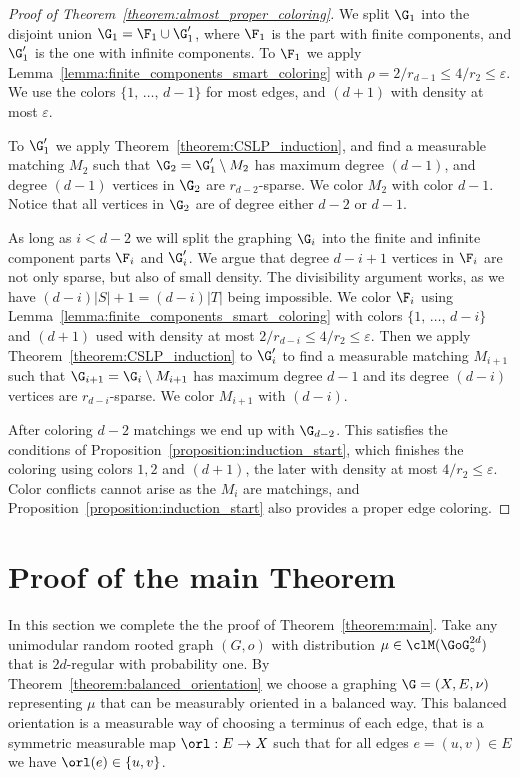 \begin{proof}[Proof of Theorem~\ref{theorem:almost_proper_coloring}]
We split $\G_1$ into the disjoint union $\G_1 = \F_1 \cup \G'_1$, where $\F_1$ is the part with finite components, and $\G'_1$ is the one with infinite components. To $\F_1$ we apply Lemma~\ref{lemma:finite_components_smart_coloring} with $\rho = 2 / r_{d-1} \leq 4 / r_2 \leq \varepsilon$. We use the colors $\{1,\,\ldots,\,d-1\}$ for most edges, and $(d+1)$ with density at most $\varepsilon$.

To $\G'_1$ we apply Theorem~\ref{theorem:CSLP_induction}, and find a measurable matching $M_2$ such that $\G_2 = \G'_1 \setminus M_2$ has maximum degree $(d-1)$, and degree $(d-1)$ vertices in $\G_2$ are $r_{d-2}$-sparse. We color $M_2$ with color $d-1$. Notice that all vertices in $\G_2$ are of degree either $d-2$ or $d-1$.

As long as $i<d-2$ we will split the graphing $\G_{i}$ into the finite and infinite component parts $\F_i$ and $\G'_{i}$. We argue that degree $d-i+1$ vertices in $\F_i$ are not only sparse, but also of small density. The divisibility argument works, as we have $(d-i)|S|+1 = (d-i)|T|$ being impossible. We color $\F_i$ using Lemma~\ref{lemma:finite_components_smart_coloring} with colors $\{1,\,\ldots,\,d-i\}$ and $(d+1)$ used with density at most $2/r_{d-i} \leq 4/r_2 \leq \varepsilon$. Then we apply Theorem~\ref{theorem:CSLP_induction} to $\G'_i$ to find a measurable matching $M_{i+1}$ such that $\G_{i+1}=\G_i \setminus M_{i+1}$ has maximum degree $d-1$ and its degree $(d-i)$ vertices are $r_{d-i}$-sparse. We color $M_{i+1}$ with $(d-i)$.

After coloring $d-2$ matchings we end up with $\G_{d-2}$. This satisfies the conditions of Proposition~\ref{proposition:induction_start}, which finishes the coloring using colors $1,2$ and $(d+1)$, the later with density at most $4/r_2 \leq \varepsilon$. Color conflicts cannot arise as the $M_i$ are matchings, and Proposition~\ref{proposition:induction_start} also provides a proper edge coloring.
\end{proof}

\section{Proof of the main Theorem} \label{section:proof_of_main}

In this section we complete the the proof of Theorem~\ref{theorem:main}. Take any unimodular random rooted graph $(G,o)$ with distribution $\mu \in \clM(\GoG^{2d}_{\circ})$ that is $2d$-regular with probability one. By Theorem~\ref{theorem:balanced_orientation} we choose a graphing $\G=(X,E,\nu)$ representing $\mu$ that can be measurably oriented in a balanced way. This balanced orientation is a measurable way of choosing a terminus of each edge, that is a symmetric measurable map $\orl: E \to X$ such that for all edges $e=(u,v) \in E$ we have $\orl(e) \in \{u,v\}$.

